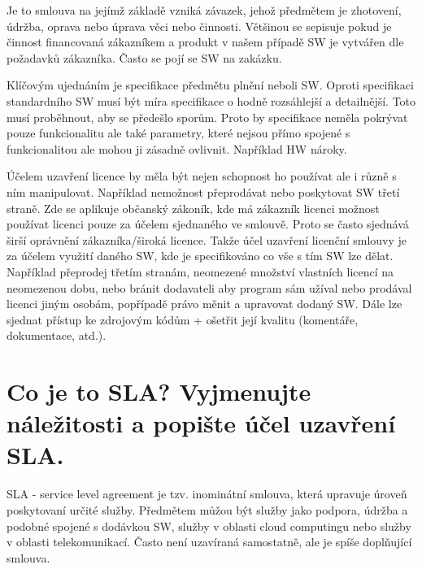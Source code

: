 Je to smlouva na jejímž základě vzniká závazek, jehož předmětem je zhotovení, údržba, oprava nebo úprava věci nebo činnosti. Většinou se sepisuje pokud je činnost financovaná zákazníkem a produkt v našem případě SW je vytvářen dle požadavků zákazníka. Často se pojí se SW na zakázku.

Klíčovým ujednáním je specifikace předmětu plnění neboli SW. Oproti specifikaci standardního SW musí být míra specifikace o hodně rozsáhlejší a detailnější. Toto musí proběhnout, aby se předešlo sporům. Proto by specifikace neměla pokrývat pouze funkcionalitu ale také parametry, které nejsou přímo spojené s funkcionalitou ale mohou ji zásadně ovlivnit. Například HW nároky.

Účelem uzavření licence by měla být nejen schopnost ho používat ale i různě s ním manipulovat. Například nemožnost přeprodávat nebo poskytovat SW třetí straně. Zde se aplikuje občanský zákoník, kde má zákazník licenci možnost používat licenci pouze za účelem sjednaného ve smlouvě. Proto se často sjednává širší oprávnění zákazníka/široká licence. Takže účel uzavření licenční smlouvy je za účelem využití daného SW, kde je specifikováno co vše s tím SW lze dělat. Například přeprodej třetím stranám, neomezené množství vlastních licencí na neomezenou dobu, nebo bránit dodavateli aby program sám užíval nebo prodával licenci jiným osobám, popřípadě právo měnit a upravovat dodaný SW. Dále lze sjednat přístup ke zdrojovým kódům + ošetřit její kvalitu (komentáře, dokumentace, atd.).


\newpage
\section{Co je to SLA? Vyjmenujte náležitosti a popište účel uzavření SLA.}

SLA - service level agreement je tzv. inominátní smlouva, která upravuje úroveň poskytovaní určité služby. Předmětem můžou být služby jako podpora, údržba a podobné spojené s dodávkou SW, služby v oblasti cloud computingu nebo služby v oblasti telekomunikací. Často není uzavíraná samostatně, ale je spíše doplňující smlouva.

